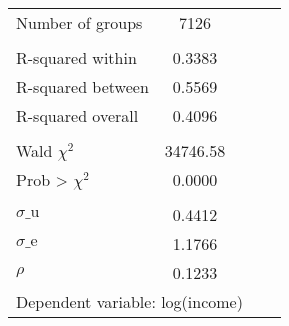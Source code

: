 {\begin{tabular}{l*{1}{cccc}}
Number of groups    &        7126&            &            &            \\
\\ R-squared within &      0.3383&            &            &            \\
R-squared between   &      0.5569&            &            &            \\
R-squared overall   &      0.4096&            &            &            \\
\\ Wald $\chi^2$    &    34746.58&            &            &            \\
Prob > $\chi^2$     &      0.0000&            &            &            \\
\\ $\sigma\text{\_u}$&      0.4412&            &            &            \\
$\sigma\text{\_e}$   &      1.1766&            &            &            \\
$\rho$              &      0.1233&            &            &            \\
\bottomrule
\multicolumn{5}{l}{\footnotesize Dependent variable: log(income)}\\
\end{tabular}
}
